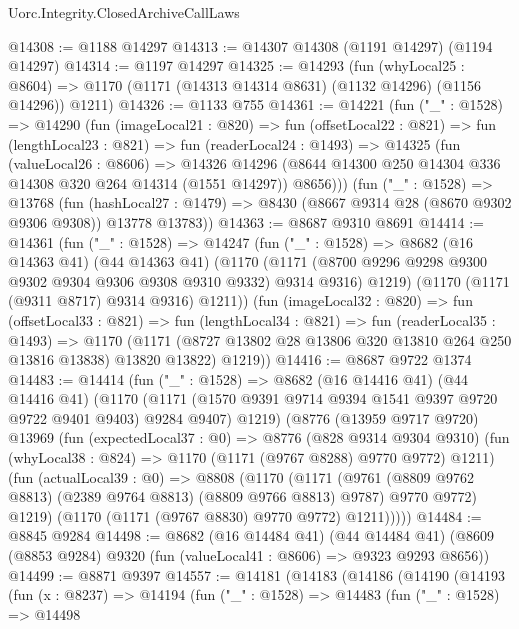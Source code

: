 \begin{lexlean}{Uorc.Integrity.ClosedArchiveCallLaws}
\begin{coremodule}
@14308 := @1188 @14297
@14313 := @14307 @14308 (@1191 @14297) (@1194 @14297)
@14314 := @1197 @14297
@14325 := @14293
    (fun (whyLocal25 : @8604) =>
    @1170 (@1171 (@14313 @14314 @8631) (@1132 @14296) (@1156 @14296)) @1211)
@14326 := @1133 @755
@14361 := @14221
    (fun ("_" : @1528) =>
    @14290
      (fun (imageLocal21 : @820) =>
      fun (offsetLocal22 : @821) =>
      fun (lengthLocal23 : @821) =>
      fun (readerLocal24 : @1493) =>
      @14325
        (fun (valueLocal26 : @8606) =>
        @14326
          @14296
          (@8644 @14300 @250 @14304 @336 @14308 @320 @264 @14314 (@1551 @14297))
          @8656)))
    (fun ("_" : @1528) =>
    @13768
      (fun (hashLocal27 : @1479) =>
      @8430 (@8667 @9314 @28 (@8670 @9302 @9306 @9308)) @13778 @13783))
@14363 := @8687 @9310 @8691
@14414 := @14361
    (fun ("_" : @1528) =>
    @14247
      (fun ("_" : @1528) =>
      @8682
        (@16 @14363 @41)
        (@44 @14363 @41)
        (@1170
          (@1171 (@8700 @9296 @9298 @9300 @9302 @9304 @9306 @9308 @9310 @9332) @9314 @9316)
          @1219)
        (@1170 (@1171 (@9311 @8717) @9314 @9316) @1211))
      (fun (imageLocal32 : @820) =>
      fun (offsetLocal33 : @821) =>
      fun (lengthLocal34 : @821) =>
      fun (readerLocal35 : @1493) =>
      @1170
        (@1171 (@8727 @13802 @28 @13806 @320 @13810 @264 @250 @13816 @13838) @13820 @13822)
        @1219))
@14416 := @8687 @9722 @1374
@14483 := @14414
    (fun ("_" : @1528) =>
    @8682
      (@16 @14416 @41)
      (@44 @14416 @41)
      (@1170
        (@1171 (@1570 @9391 @9714 @9394 @1541 @9397 @9720 @9722 @9401 @9403) @9284 @9407)
        @1219)
      (@8776
        (@13959 @9717 @9720)
        @13969
        (fun (expectedLocal37 : @0) =>
        @8776
          (@828 @9314 @9304 @9310)
          (fun (whyLocal38 : @824) => @1170 (@1171 (@9767 @8288) @9770 @9772) @1211)
          (fun (actualLocal39 : @0) =>
          @8808
            (@1170
              (@1171
                (@9761 (@8809 @9762 @8813) (@2389 @9764 @8813) (@8809 @9766 @8813) @9787)
                @9770
                @9772)
              @1219)
            (@1170 (@1171 (@9767 @8830) @9770 @9772) @1211)))))
@14484 := @8845 @9284
@14498 := @8682
    (@16 @14484 @41)
    (@44 @14484 @41)
    (@8609 (@8853 @9284) @9320 (fun (valueLocal41 : @8606) => @9323 @9293 @8656))
@14499 := @8871 @9397
@14557 := @14181
    (@14183
      (@14186
        (@14190
          (@14193
            (fun (x : @8237) =>
            @14194
              (fun ("_" : @1528) =>
              @14483
                (fun ("_" : @1528) =>
                @14498

\end{coremodule}
\end{lexlean}
